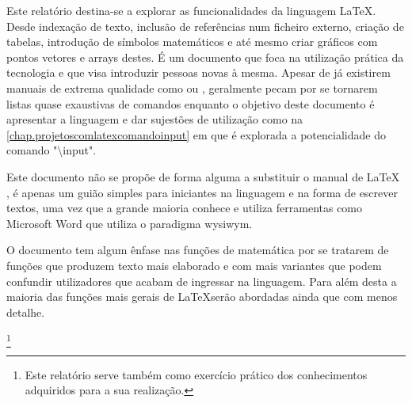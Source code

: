 Este relatório destina-se a explorar as funcionalidades da linguagem \LaTeX.
Desde indexação de texto, inclusão de referências num ficheiro externo, criação de tabelas, introdução de símbolos matemáticos e até mesmo criar gráficos com pontos vetores e arrays destes. É um documento que foca na utilização prática da tecnologia e que visa introduzir pessoas novas à mesma. Apesar de já existirem manuais de extrema qualidade como \cite{tnssl} ou \cite{semautor}, geralmente pecam por se tornarem listas quase exaustivas de comandos enquanto o objetivo deste documento é apresentar a linguagem e dar sujestões de utilização como na  \autoref{chap.projetoscomlatexcomandoinput} em que é explorada a potencialidade do comando "\textbackslash input".

Este documento não se propõe de forma alguma a substituir o manual de \LaTeX  \cite{Lamport.94} , é apenas um guião simples para iniciantes na linguagem e na forma de escrever textos, uma vez que a grande maioria conhece e utiliza ferramentas como Microsoft Word que utiliza o paradigma \ac{wysiwym}.

O documento tem algum ênfase nas funções de matemática por se tratarem de funções que produzem texto mais elaborado e com mais variantes que podem confundir utilizadores que acabam de ingressar na linguagem. Para além desta a maioria das funções mais gerais de \LaTeX serão abordadas ainda que com menos detalhe.

\footnote{Este relatório serve também como exercício prático dos conhecimentos adquiridos para a sua realização.}
